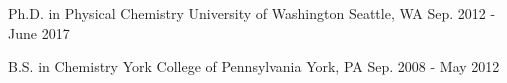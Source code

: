


\begin{cventries}


\cventry
{Ph.D. in Physical Chemistry
} %
{University of Washington} %
{Seattle, WA} %
{Sep. 2012 - June 2017} %
{}



\cventry
{B.S. in Chemistry} %
{York College of Pennsylvania} %
{York, PA} %
{Sep. 2008 - May 2012} %
{}


\end{cventries}
